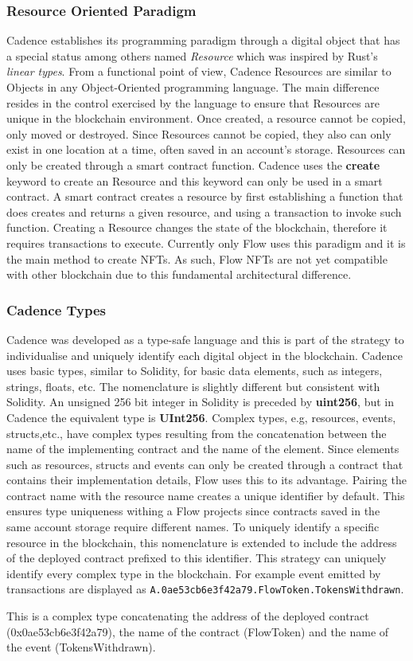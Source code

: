\documentclass[../NFTComp_IEEE.tex]{subfiles}
\begin{document}
\subsubsection{Resource Oriented Paradigm}
Cadence establishes its programming paradigm through a digital object that has a special status among others named \textit{Resource} which was inspired by Rust's \textit{linear types}. From a functional point of view, Cadence Resources are similar to Objects in any Object-Oriented programming language. The main difference resides in the control exercised by the language to ensure that Resources are unique in the blockchain environment. Once created, a resource cannot be copied, only moved or destroyed. Since Resources cannot be copied, they also can only exist in one location at a time, often saved in an account's storage. Resources can only be created through a smart contract function. Cadence uses the \textbf{create} keyword to create an Resource and this keyword can only be used in a smart contract. A smart contract creates a resource by first establishing a function that does creates and returns a given resource, and using a transaction to invoke such function. Creating a Resource changes the state of the blockchain, therefore it requires transactions to execute. Currently only Flow uses this paradigm and it is the main method to create NFTs. As such, Flow NFTs are not yet compatible with other blockchain due to this fundamental architectural difference.

\subsubsection{Cadence Types}
Cadence was developed as a type-safe language and this is part of the strategy to individualise and uniquely identify each digital object in the blockchain. Cadence uses basic types, similar to Solidity, for basic data elements, such as integers, strings, floats, etc. The nomenclature is slightly different but consistent with Solidity. An unsigned 256 bit integer in Solidity is preceded by \textbf{uint256}, but in Cadence the equivalent type is \textbf{UInt256}. Complex types, e.g, resources, events, structs,etc., have complex types resulting from the concatenation between the name of the implementing contract and the name of the element. Since elements such as resources, structs and events can only be created through a contract that contains their implementation details, Flow uses this to its advantage. Pairing the contract name with the resource name creates a unique identifier by default. This ensures type uniqueness withing a Flow projects since contracts saved in the same account storage require different names. To uniquely identify a specific resource in the blockchain, this nomenclature is extended to include the address of the deployed contract prefixed to this identifier. This strategy can uniquely identify every complex type in the blockchain. For example event emitted by transactions are displayed as \verb|A.0ae53cb6e3f42a79.FlowToken.TokensWithdrawn|.
\par
This is a complex type concatenating the address of the deployed contract (0x0ae53cb6e3f42a79), the name of the contract (FlowToken) and the name of the event (TokensWithdrawn).
\end{document}
